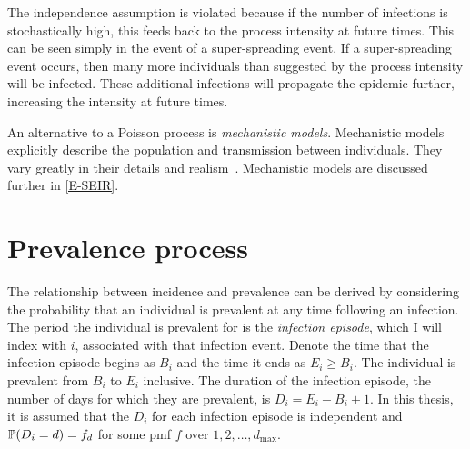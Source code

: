 \documentclass[thesis.tex]{subfiles}
\begin{document}
The independence assumption is violated because if the number of infections is stochastically high, this feeds back to the process intensity at future times.
This can be seen simply in the event of a super-spreading event.
If a super-spreading event occurs, then many more individuals than suggested by the process intensity will be infected.
These additional infections will propagate the epidemic further, increasing the intensity at future times.

An alternative to a Poisson process is \emph{mechanistic models}.
Mechanistic models explicitly describe the population and transmission between individuals.
They vary greatly in their details and realism~\autocite{murilloMultiscale}.
Mechanistic models are discussed further in \cref{E-SEIR}.






\section{Prevalence process}

The relationship between incidence and prevalence can be derived by considering the probability that an individual is prevalent at any time following an infection.
The period the individual is prevalent for is the \emph{infection episode}, which I will index with $i$, associated with that infection event.
Denote the time that the infection episode begins as $B_i$ and the time it ends as $E_i \geq B_i$.
The individual is prevalent from $B_i$ to $E_i$ inclusive.
The duration of the infection episode, the number of days for which they are prevalent, is $D_i = E_i - B_i + 1$.
In this thesis, it is assumed that the $D_i$ for each infection episode is independent and $\operatorname{\mathbb{P}}(D_i = d) = f_d$ for some pmf $f$ over $1, 2, \dots, d_\text{max}$.
\end{document}
